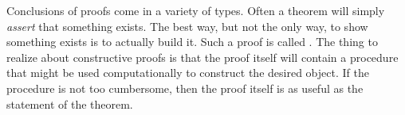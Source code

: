 \begin{para}Conclusions of proofs come in a variety of types.  Often a theorem will simply {\em assert} that something exists.  The best way, but not the only way, to show something exists is to actually build it.  Such a proof is called .  The thing to realize about constructive proofs is that the proof itself will contain a procedure that might be used computationally to construct the desired object.  If the procedure is not too cumbersome, then  the proof itself is as useful as the statement of the theorem.\end{para}
